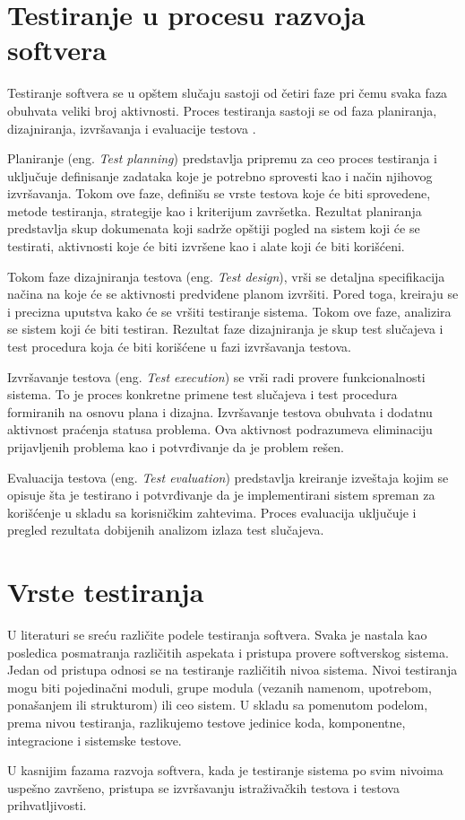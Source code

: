 \documentclass[12pt,oneside]{memoir}
\begin{document}
\section{Testiranje u procesu razvoja softvera} \label{broj1}
\par 
Testiranje softvera se u opštem slučaju sastoji od četiri faze pri čemu svaka faza obuhvata veliki broj aktivnosti. Proces testiranja sastoji se od faza planiranja, dizajniranja, izvršavanja i evaluacije testova \cite{ImportanceOfTesting}.
\par
Planiranje (eng. \textit{Test planning}) predstavlja pripremu za ceo proces testiranja i uključuje definisanje zadataka koje je potrebno sprovesti kao i način njihovog izvršavanja. Tokom ove faze, definišu se vrste testova koje će biti sprovedene, metode testiranja, strategije kao i kriterijum završetka. Rezultat planiranja predstavlja skup dokumenata koji sadrže opštiji pogled na sistem koji će se testirati, aktivnosti koje će biti izvršene kao i alate koji će biti korišćeni.
\par 
Tokom faze dizajniranja testova (eng. \textit{Test design}), vrši se detaljna specifikacija načina na koje će se aktivnosti predviđene planom izvršiti. Pored toga, kreiraju se i precizna uputstva kako će se vršiti testiranje sistema. Tokom ove faze, analizira se sistem koji će biti testiran. Rezultat faze dizajniranja je skup test slučajeva i test procedura koja će biti korišćene u fazi izvršavanja testova.
\par
Izvršavanje testova (eng. \textit{Test execution}) se vrši radi provere funkcionalnosti sistema.
To je proces konkretne primene test slučajeva i test procedura formiranih na osnovu plana i dizajna. Izvršavanje testova obuhvata i dodatnu aktivnost praćenja statusa problema. Ova aktivnost podrazumeva eliminaciju prijavljenih problema kao i potvrđivanje da je problem rešen.
\par
Evaluacija testova (eng. \textit{Test evaluation}) predstavlja kreiranje izveštaja kojim se opisuje šta je testirano i potvrđivanje da je implementirani sistem spreman za korišćenje u skladu sa korisničkim zahtevima. Proces evaluacija uključuje i pregled rezultata dobijenih analizom izlaza test slučajeva.   

\section{Vrste testiranja} \label{broj2}

U literaturi se sreću različite podele testiranja softvera. Svaka je nastala kao posledica posmatranja različitih aspekata i pristupa provere softverskog sistema.
Jedan od pristupa odnosi se na testiranje različitih nivoa sistema. Nivoi testiranja mogu biti pojedinačni moduli, grupe modula (vezanih namenom, upotrebom, ponašanjem ili strukturom) ili ceo sistem.
U skladu sa pomenutom podelom, prema nivou testiranja, razlikujemo testove jedinice koda, komponentne, integracione i sistemske testove.
\par
U kasnijim fazama razvoja softvera, kada je testiranje sistema po svim nivoima uspešno završeno, pristupa se izvršavanju istraživačkih testova i testova prihvatljivosti.
\par
\end{document}
